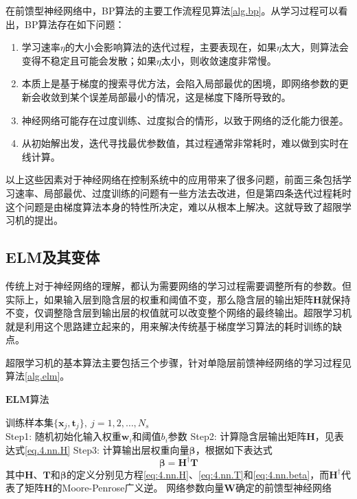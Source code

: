 在前馈型神经网络中，BP算法的主要工作流程见算法\eqref{alg.bp}。从学习过程可以看出，BP算法存在如下问题：
\begin{enumerate}
\item 学习速率$\eta$的大小会影响算法的迭代过程，主要表现在，如果$\eta$太大，则算法会变得不稳定且可能会发散；如果$\eta$太小，则收敛速度非常慢。
\item 本质上是基于梯度的搜索寻优方法，会陷入局部最优的困境，即网络参数的更新会收敛到某个误差局部最小的情况，这是梯度下降所导致的。
\item 神经网络可能存在过度训练、过度拟合的情形，以致于网络的泛化能力很差。
\item 从初始解出发，迭代寻找最优参数值，其过程通常非常耗时，难以做到实时在线计算。
\end{enumerate}

以上这些因素对于神经网络在控制系统中的应用带来了很多问题，前面三条包括学习速率、局部最优、过度训练的问题有一些方法去改进，但是第四条迭代过程耗时这个问题是由梯度算法本身的特性所决定，难以从根本上解决。这就导致了超限学习机的提出。

\subsection{ELM及其变体}
传统上对于神经网络的理解，都认为需要网络的学习过程需要调整所有的参数。但实际上，如果输入层到隐含层的权重和阈值不变，那么隐含层的输出矩阵$\bm{H}$就保持不变，仅调整隐含层到输出层的权值就可以改变整个网络的最终输出。超限学习机就是利用这个思路建立起来的，用来解决传统基于梯度学习算法的耗时训练的缺点。

超限学习机的基本算法主要包括三个步骤，针对单隐层前馈神经网络的学习过程见算法\ref{alg.elm}。
\begin{algo}
\caption{$\mathbf{ELM}$算法}
\label{alg.elm}
\begin{algorithmic}%
\REQUIRE 训练样本集$\{\bm{x}_{j},\bm{t}_{j}\},\ j=1,2,\ldots,N_{s}$\\
\STATE Step1: 随机初始化输入权重$\bm{w}_{i}$和阈值$b_{i}$参数
\STATE Step2: 计算隐含层输出矩阵$\bm{H}$，见表达式\eqref{eq.4.nn.H}
\STATE Step3: 计算输出层权重向量$\bm{\beta}$，根据如下表达式
\begin{equation}\label{eq:4.elm.beta}
\bm{\beta}=\bm{H}^{\dag}\bm{T}
\end{equation}
其中$\bm{H}$、$\bm{T}$和$\bm{\beta}$的定义分别见方程\eqref{eq:4.nn.H}、\eqref{eq:4.nn.T}和\eqref{eq:4.nn.beta}，而$\bm{H}^{\dag}$代表了矩阵$\bm{H}$的Moore-Penrose广义逆。
\ENSURE 网络参数向量$\bm{W}$确定的前馈型神经网络\\
\end{algorithmic}
\end{algo}

